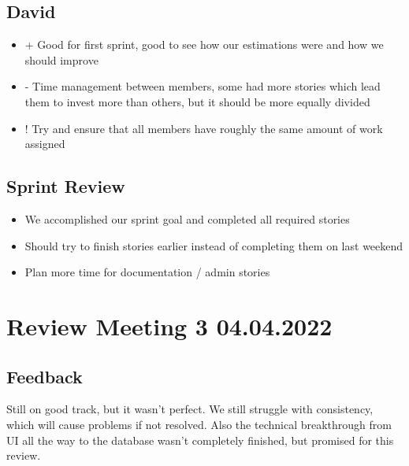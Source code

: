 \subsection{David}
\begin{itemize}
    \item + Good for first sprint, good to see how our estimations were and how we should improve
    \item - Time management between members, some had more stories which lead them to invest more than others, but it should be more equally divided
    \item ! Try and ensure that all members have roughly the same amount of work assigned
\end{itemize}

\subsection{Sprint Review}
\begin{itemize}
    \item We accomplished our sprint goal and completed all required stories
    \item Should try to finish stories earlier instead of completing them on last weekend
    \item Plan more time for documentation / admin stories
\end{itemize}


\section{Review Meeting 3 04.04.2022}

\subsection{Feedback}
Still on good track, but it wasn't perfect.
We still struggle with consistency, which will cause problems if not resolved.
Also the technical breakthrough from UI all the way to the database wasn't completely finished, but promised for this review.

